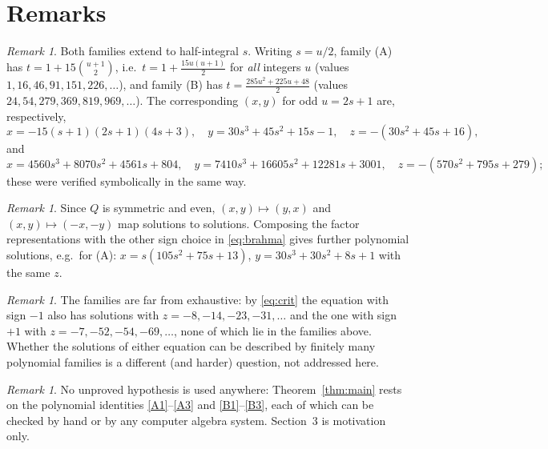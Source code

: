\documentclass[11pt]{article}
\theoremstyle{remark}
\newtheorem{remark}[theorem]{Remark}
\begin{document}
\section{Remarks}

\begin{remark}\label{rem:half}
Both families extend to half-integral $s$. Writing $s=u/2$, family (A) has
$t=1+15\binom{u+1}{2}$, i.e.\ $t=1+\tfrac{15u(u+1)}{2}$ for \emph{all} integers $u$ (values $1,16,46,91,151,226,\dots$),
and family (B) has $t=\tfrac{285u^{2}+225u+48}{2}$ (values $24,54,279,369,819,969,\dots$). The corresponding
$(x,y)$ for odd $u=2s+1$ are, respectively,
\[
x=-15(s+1)(2s+1)(4s+3),\quad y=30s^{3}+45s^{2}+15s-1,\quad z=-(30s^{2}+45s+16),
\]
and
\[
x=4560s^{3}+8070s^{2}+4561s+804,\quad y=7410s^{3}+16605s^{2}+12281s+3001,\quad z=-(570s^{2}+795s+279);
\]
these were verified symbolically in the same way.
\end{remark}

\begin{remark}
Since $Q$ is symmetric and even, $(x,y)\mapsto(y,x)$ and $(x,y)\mapsto(-x,-y)$ map solutions to solutions.
Composing the factor representations with the other sign choice in \eqref{eq:brahma} gives further
polynomial solutions, e.g.\ for (A): $x=s(105s^{2}+75s+13)$, $y=30s^{3}+30s^{2}+8s+1$ with the same $z$.
\end{remark}

\begin{remark}
The families are far from exhaustive: by \eqref{eq:crit} the equation with sign $-1$ also has solutions with
$z=-8,-14,-23,-31,\dots$ and the one with sign $+1$ with $z=-7,-52,-54,-69,\dots$, none of which lie in the
families above. Whether the solutions of either equation can be described by finitely many polynomial
families is a different (and harder) question, not addressed here.
\end{remark}

\begin{remark}
No unproved hypothesis is used anywhere: Theorem~\ref{thm:main} rests on the polynomial identities
\eqref{A1}--\eqref{A3} and \eqref{B1}--\eqref{B3}, each of which can be checked by hand or by any computer
algebra system. Section~3 is motivation only.
\end{remark}
\end{document}
